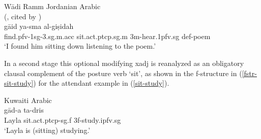 \documentclass[output=paper,hidelinks]{langscibook}
\begin{document}
\ea \label{sit-listen} W\={a}di Ramm Jordanian Arabic \\
\hfill(\citealt{almashaqba15}, cited by \citealt[24]{camilleri2020grammaticalisation}) \\
 {g\={a}{\textrevglotstop}id} {ya-sma{\textrevglotstop}} {al-gi\d{s}idah} \\
{find.{\sc pfv-1sg-3.sg.m.acc}} {sit.{\sc act.ptcp.sg.m}} {{\sc 3m}-hear.{\sc 1pfv.sg}} {{\sc def}-poem} \\
\glt `I found him sitting down listening to the poem.'  \\
\z


In a second stage this optional modifying {\sc xadj} is reanalyzed as an obligatory clausal complement of the posture verb `sit', as shown in the f-structure in (\ref{fstr-sit-study}) for the attendant  example in (\ref{sit-study}). 

\ea \label{sit-study} Kuwaiti Arabic \citep[28]{camilleri2020grammaticalisation}\\
 {g\={a}{\textrevglotstop}d-a} {ta-dris}\\
{Layla} {sit.{\sc act.ptcp-sg.f}} {\sc 3f-}study.{\sc ipfv.sg} \\
\glt `Layla is (sitting) studying.' 
\z

\end{document}
